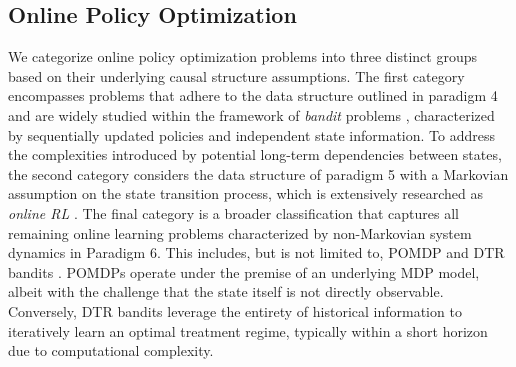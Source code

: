 \subsection{Online Policy Optimization}
We categorize online policy optimization problems into three distinct groups based on their underlying causal structure assumptions. 
The first category encompasses problems that adhere to the data structure outlined in paradigm 4 and are widely studied within the framework of \textit{bandit} problems \citep{slivkins2019introduction,lattimore2020bandit}, characterized by sequentially updated policies and independent state information. 
To address the complexities introduced by potential long-term dependencies between states, the second category considers the data structure of paradigm 5 with a Markovian assumption on the state transition process, which is extensively researched as \textit{online \acrshort{RL}} \citep{sutton2018reinforcement}. 
The final category is a broader classification that captures all remaining online learning problems characterized by non-Markovian system dynamics in Paradigm 6. 
This includes, but is not limited to, \acrshort{POMDP} \citep{meng2021memory, spaan2012partially, zhu2017improving} and \acrshort{DTR} bandits \citep{hu2020dtr}. 
\acrshort{POMDP}s operate under the premise of an underlying \acrshort{MDP} model, albeit with the challenge that the state itself is not directly observable. 
Conversely, \acrshort{DTR} bandits leverage the entirety of historical information to iteratively learn an optimal treatment regime, typically within a short horizon due to computational complexity.

